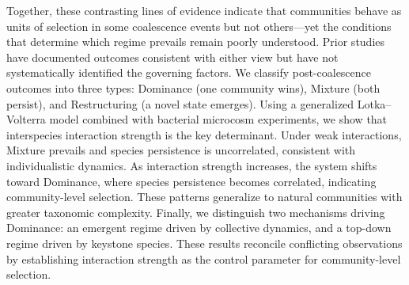 Together, these contrasting lines of evidence indicate that communities behave as units of selection in some coalescence events but not others—yet the conditions that determine which regime prevails remain poorly understood. Prior studies have documented outcomes consistent with either view but have not systematically identified the governing factors. We classify post-coalescence outcomes into three types: Dominance (one community wins), Mixture (both persist), and Restructuring (a novel state emerges). Using a generalized Lotka--Volterra model combined with bacterial microcosm experiments, we show that interspecies interaction strength is the key determinant. Under weak interactions, Mixture prevails and species persistence is uncorrelated, consistent with individualistic dynamics. As interaction strength increases, the system shifts toward Dominance, where species persistence becomes correlated, indicating community-level selection. These patterns generalize to natural communities with greater taxonomic complexity. Finally, we distinguish two mechanisms driving Dominance: an emergent regime driven by collective dynamics, and a top-down regime driven by keystone species. These results reconcile conflicting observations by establishing interaction strength as the control parameter for community-level selection.
